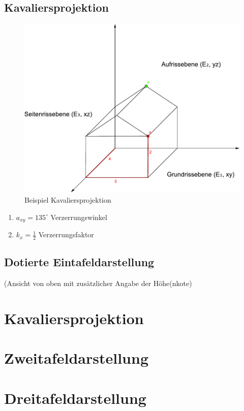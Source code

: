 \documentclass[12pt,a4paper]{scrbook}
\begin{document}
\subsection{Kavaliersprojektion}
\begin{figure}[h]
  \centering
  \includegraphics[scale=0.8]{img/DGeinfuehrung_2.pdf}
  \caption{Beispiel Kavaliersprojektion}
\end{figure}

\begin{enumerate}
\item $a_{xy} = 135^{\circ}$ Verzerrungswinkel
\item $k_{x} = \frac{1}{2}$ Verzerrungsfaktor
\end{enumerate}

\subsection{Dotierte Eintafeldarstellung}
(Ansicht von oben mit zusätzlicher Angabe der Höhe(nkote)
\begin{figure}

\end{figure}

\section{Kavaliersprojektion}
\section{Zweitafeldarstellung}
\section{Dreitafeldarstellung}
\end{document}
